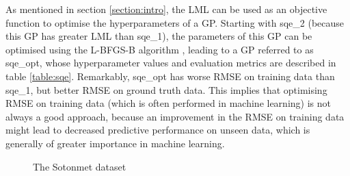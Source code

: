 \documentclass{article}
\begin{document}
As mentioned in section \ref{section:intro}, the LML can be used as an objective function to optimise the hyperparameters of a GP. Starting with sqe\_2 (because this GP has greater LML than sqe\_1), the parameters of this GP can be optimised using the L-BFGS-B algorithm \cite{wright1999numerical}, leading to a GP referred to as sqe\_opt, whose hyperparameter values and evaluation metrics are described in table \ref{table:sqe}. Remarkably, sqe\_opt has worse RMSE on training data than sqe\_1, but better RMSE on ground truth data. This implies that optimising RMSE on training data (which is often performed in machine learning) is not always a good approach, because an improvement in the RMSE on training data might lead to decreased predictive performance on unseen data, which is generally of greater importance in machine learning.

\appendix


\begin{figure}[pht]
    \centering
    \caption{The Sotonmet dataset}
    \label{fig:sotonmet}
\end{figure}

\end{document}
